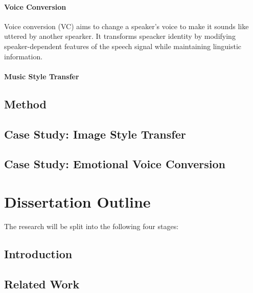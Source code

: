 \documentclass{article}
\begin{document}
\paragraph{Voice Conversion}
Voice conversion (VC) aims to change a speaker's voice to make it sounds like uttered by another spearker. It transforms speacker identity by modifying speaker-dependent features of the speech signal while maintaining linguistic information.




\paragraph{Music Style Transfer}



\subsection{Method}

\subsection{Case Study: Image Style Transfer}

\subsection{Case Study: Emotional Voice Conversion}



\section{Dissertation Outline}
\label{Sec:Outline}

The research will be split into the following four stages:

\subsection{Introduction}

\subsection{Related Work}
\end{document}

